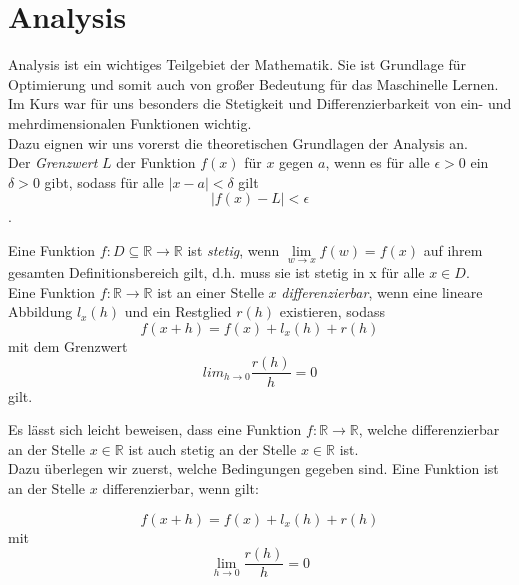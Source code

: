 \section{Analysis}
  

Analysis ist ein wichtiges Teilgebiet der Mathematik. Sie ist Grundlage für Optimierung und somit auch von großer Bedeutung für das Maschinelle Lernen. Im Kurs war für uns besonders die Stetigkeit und Differenzierbarkeit von ein- und mehrdimensionalen Funktionen wichtig. \\
Dazu eignen wir uns vorerst die theoretischen Grundlagen der Analysis an. \\


Der \emph{Grenzwert} $L$ der Funktion $f(x)$ für $x$ gegen $a$, wenn es für alle $\epsilon > 0$ ein $\delta > 0$ gibt, sodass für alle $|x-a| < \delta$ gilt \begin{equation*}|f(x)-L|<\epsilon\end{equation*}.


Eine Funktion $f: D \subseteq \mathbb{R}\rightarrow \mathbb{R}$ ist \emph{stetig}, wenn $\lim\limits_{w\rightarrow x}f(w)=f(x)$ auf ihrem gesamten Definitionsbereich gilt, d.h. muss sie ist stetig in x für alle $x\in D$. \\


Eine Funktion $f:\mathbb{R}\rightarrow \mathbb{R}$ ist an einer Stelle $x$ \emph{differenzierbar}, wenn eine lineare Abbildung $ l_ x (h)$ und ein Restglied $r(h)$ existieren, sodass \begin{equation*}f(x+h)=f(x)+l_{x}(h)+r(h)\end{equation*} mit dem Grenzwert \begin{equation*}lim_{h\rightarrow 0} \frac{r(h)}{h}= 0\end{equation*}gilt.

Es lässt sich leicht beweisen, dass eine Funktion $f:\mathbb{R} \rightarrow \mathbb{R}$, welche differenzierbar an der Stelle $x \in \mathbb{R}$ ist auch stetig an der Stelle $x \in \mathbb{R}$ ist.\\ %

Dazu überlegen wir zuerst, welche Bedingungen gegeben sind. Eine Funktion ist an der Stelle $x$ differenzierbar, wenn gilt:

\begin{equation*}f(x+h)=f(x)+l_x(h)+ r(h)  \end{equation*}  
mit 
\begin{equation*} \lim\limits_{h \rightarrow 0} \frac{r(h)}{h}= 0  \end{equation*}


